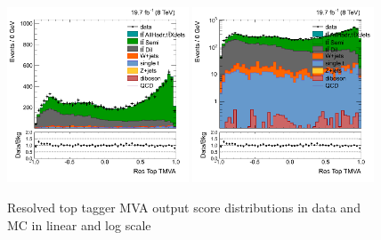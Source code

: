 \begin{figure}[htbp]
	\centering
	\includegraphics[width=0.48\textwidth]{figures/semilep_1tightmuo_resolved_3ormorejets_2ormorejetWPm_pfmetmore100_pfmtmore40_trigrequestonMC_17102015/hResTopMVAlinear.png}
	\includegraphics[width=0.48\textwidth]{figures/semilep_1tightmuo_resolved_3ormorejets_2ormorejetWPm_pfmetmore100_pfmtmore40_trigrequestonMC_17102015/hResTopMVA.png}
	\caption{Resolved top tagger MVA output score distributions in data and MC in linear and log scale}
	\label{fig:score}
\end{figure}


